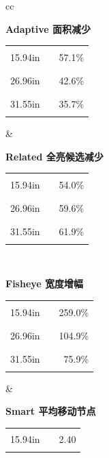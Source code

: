 \documentclass[11pt,a4paper,oneside,extrafontsizes]{memoir}
\begin{document}
\begin{center}
\begin{figure}[htbp]
\centering
\begin{tabular}{cc}
\begin{minipage}[t]{0.46\textwidth}
\centering
\textbf{Adaptive 面积减少}\\[-0.2em]
\begin{tabular}{@{}r l r@{}}
15.94in & \textcolor{blue!70!black}{\rule{0.2000\textwidth}{1.1ex}} & 57.1\% \\
26.96in & \textcolor{blue!70!black}{\rule{0.1491\textwidth}{1.1ex}} & 42.6\% \\
31.55in & \textcolor{blue!70!black}{\rule{0.1249\textwidth}{1.1ex}} & 35.7\% \\
\end{tabular}
\end{minipage}
&
\begin{minipage}[t]{0.46\textwidth}
\centering
\textbf{Related 全亮候选减少}\\[-0.2em]
\begin{tabular}{@{}r l r@{}}
15.94in & \textcolor{blue!70!black}{\rule{0.1745\textwidth}{1.1ex}} & 54.0\% \\
26.96in & \textcolor{blue!70!black}{\rule{0.1926\textwidth}{1.1ex}} & 59.6\% \\
31.55in & \textcolor{blue!70!black}{\rule{0.2000\textwidth}{1.1ex}} & 61.9\% \\
\end{tabular}
\end{minipage} \\[1.2em]
\begin{minipage}[t]{0.46\textwidth}
\centering
\textbf{Fisheye 宽度增幅}\\[-0.2em]
\begin{tabular}{@{}r l r@{}}
15.94in & \textcolor{blue!70!black}{\rule{0.2000\textwidth}{1.1ex}} & 259.0\% \\
26.96in & \textcolor{blue!70!black}{\rule{0.0810\textwidth}{1.1ex}} & 104.9\% \\
31.55in & \textcolor{blue!70!black}{\rule{0.0586\textwidth}{1.1ex}} & 75.9\% \\
\end{tabular}
\end{minipage}
&
\begin{minipage}[t]{0.46\textwidth}
\centering
\textbf{Smart 平均移动节点}\\[-0.2em]
\begin{tabular}{@{}r l r@{}}
15.94in & \textcolor{blue!70!black}{\rule{0.2000\textwidth}{1.1ex}} & 2.40 \\

\end{tabular}
\end{minipage}
\end{tabular}
\end{figure}
\end{center}
\end{document}
